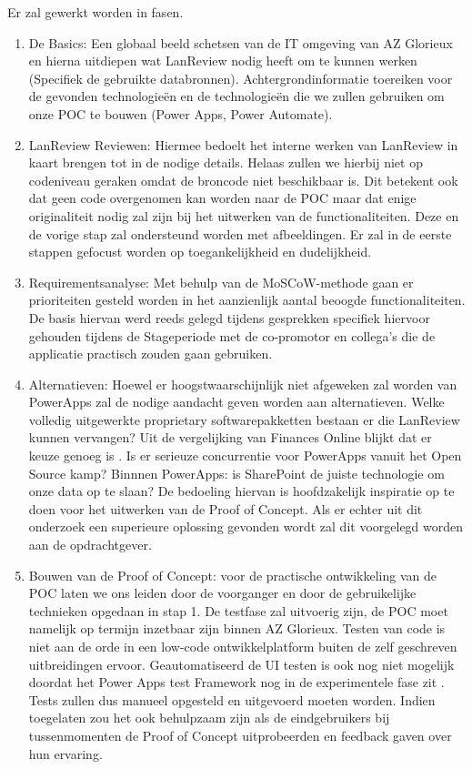 Er zal gewerkt worden in fasen. 
\begin{enumerate}
    \item De Basics: Een globaal beeld schetsen van de IT omgeving van AZ Glorieux en hierna uitdiepen wat LanReview nodig heeft om te kunnen werken (Specifiek de gebruikte databronnen). Achtergrondinformatie toereiken voor de gevonden technologieën en de technologieën die we zullen gebruiken om onze POC te bouwen (Power Apps, Power Automate).
    \item LanReview Reviewen: Hiermee bedoelt het interne werken van LanReview in kaart brengen tot in de nodige details. Helaas zullen we hierbij niet op codeniveau geraken omdat de broncode niet beschikbaar is. Dit betekent ook dat geen code overgenomen kan worden naar de POC maar dat enige originaliteit nodig zal zijn bij het uitwerken van de functionaliteiten. Deze en de vorige stap zal ondersteund worden met afbeeldingen. Er zal in de eerste stappen gefocust worden op toegankelijkheid en dudelijkheid.
    \item Requirementsanalyse: Met behulp van de MoSCoW-methode gaan er prioriteiten gesteld worden in het aanzienlijk aantal beoogde functionaliteiten. De basis hiervan werd reeds gelegd tijdens gesprekken specifiek hiervoor gehouden tijdens de Stageperiode met de co-promotor en collega's die de applicatie practisch zouden gaan gebruiken.
    \item Alternatieven: Hoewel er hoogstwaarschijnlijk niet afgeweken zal worden van PowerApps zal de nodige aandacht geven worden aan alternatieven. Welke volledig uitgewerkte proprietary softwarepakketten bestaan er die LanReview kunnen vervangen? Uit de vergelijking van Finances Online blijkt dat er keuze genoeg is \parencite{FinancesOnline2020}. Is er serieuze concurrentie voor PowerApps vanuit het Open Source kamp? Binnnen PowerApps: is SharePoint de juiste technologie om onze data op te slaan? De bedoeling hiervan is hoofdzakelijk inspiratie op te doen voor het uitwerken van de Proof of Concept. Als er echter uit dit onderzoek een superieure oplossing gevonden wordt zal dit voorgelegd worden aan de opdrachtgever.
   \item Bouwen van de Proof of Concept: voor de practische ontwikkeling van de POC laten we ons leiden door de voorganger en door de gebruikelijke technieken opgedaan in stap 1. De testfase zal uitvoerig zijn, de POC moet namelijk op termijn inzetbaar zijn binnen AZ Glorieux. Testen van code is niet aan de orde in een low-code ontwikkelplatform buiten de zelf geschreven uitbreidingen ervoor. Geautomatiseerd de UI testen is ook nog niet mogelijk doordat het Power Apps test Framework nog in de experimentele fase zit \parencite{Microsoft2020a}. Tests zullen dus manueel opgesteld en uitgevoerd moeten worden. Indien toegelaten zou het ook behulpzaam zijn als de eindgebruikers bij tussenmomenten de Proof of Concept uitprobeerden en feedback gaven over hun ervaring.

\end{enumerate}
